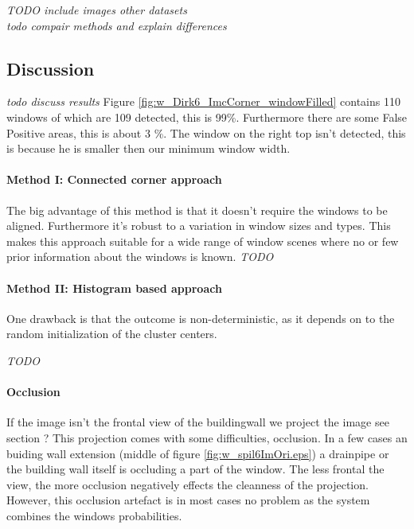 


\emph{TODO include images other datasets} \\
\emph{todo compair methods and explain differences}


\subsection{Discussion}  %
\emph{ todo discuss results }
Figure \ref{fig:w_Dirk6_ImcCorner_windowFilled} contains 110 windows of which
are 109 detected, this is 99\%. Furthermore there are some False Positive areas,
this is about 3 \%.  The window on the right top isn't detected, this is because
he is smaller then our minimum window width.

\paragraph{Method I: Connected corner approach} 
The big advantage of this method is that it doesn't require the windows to be aligned.
Furthermore it's robust to a variation in window sizes and types. This makes
this approach suitable for a wide range of window scenes where no or few prior
information about the windows is known.
\emph{TODO}


\paragraph{Method II: Histogram based approach} 
One drawback is that the outcome is non-deterministic, as it depends on to the
random initialization of the cluster centers.

\emph{TODO}\\

\paragraph{Occlusion}
\label{lab:occlusion}
If the image isn't the frontal view of the buildingwall we project the image 
see section ?%
This projection comes with some difficulties, occlusion.  In a few cases an
buiding wall extension (middle of figure \ref{fig:w_spil6ImOri.eps}) a drainpipe
or the building wall itself is occluding a part of the window.  The less frontal
the view, the more occlusion negatively effects the cleanness of the projection.
However, this occlusion artefact is in most cases no problem as the system
combines the windows probabilities.  

